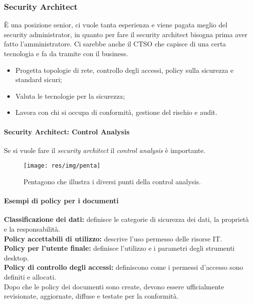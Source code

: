 \subsubsection{Security Architect}

È una posizione senior, ci vuole tanta esperienza e viene pagata meglio del
security administrator, in quanto per fare il security architect bisogna
prima aver fatto l'amministratore.
Ci sarebbe anche il CTSO che capisce di una certa tecnologia e fa da tramite
con il business.

\begin{itemize}
\item Progetta topologie di rete, controllo degli accessi, policy sulla sicurezza
e standard sicuri;
\item Valuta le tecnologie per la sicurezza;
\item Lavora con chi si occupa di conformità, gestione del rischio e audit.
\end{itemize}

\paragraph{Security Architect: Control Analysis}

Se si vuole fare il \textit{security architect} il \textit{control analysis} è
importante.

\begin{figure}[h!]
        \begin{center}
                \texttt{[image: res/img/penta]}
        \end{center}
        \caption{Pentagono che illustra i diversi punti della control analysis.}
\end{figure}

\paragraph*{Esempi di policy per i documenti}

\textbf{Classificazione dei dati:} definisce le categorie di sicurezza dei dati, la
proprietà e la responsabilità.\\
\newline
\textbf{Policy accettabili di utilizzo:} descrive l'uso permesso delle risorse IT.\\
\newline
\textbf{Policy per l'utente finale:} definisce l'utilizzo e i parametri degli strumenti
desktop.\\
\newline
\textbf{Policy di controllo degli accessi:} definiscono come i permessi d'accesso sono
definiti e allocati.\\
\newline
Dopo che le policy dei documenti sono create, devono essere ufficialmente revisionate,
aggiornate, diffuse e testate per la conformità.
